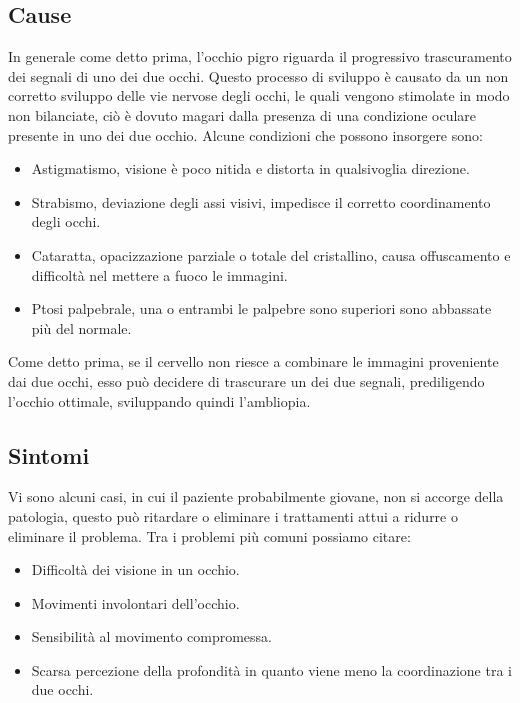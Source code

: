 \documentclass[10pt,a4paper]{article}
\begin{document}
	\subsection{Cause}
	In generale come detto prima, l'occhio pigro riguarda il progressivo trascuramento dei segnali di uno dei due occhi.
	Questo processo di sviluppo è causato da un non corretto sviluppo delle vie nervose degli occhi, le quali vengono stimolate in modo non bilanciate, ciò è dovuto magari dalla presenza di una condizione oculare presente in uno dei due occhio.
	Alcune condizioni che possono insorgere sono:
	\begin{itemize}
		\item Astigmatismo, visione è poco nitida e distorta in qualsivoglia direzione.
		\item Strabismo, deviazione degli assi visivi, impedisce il corretto coordinamento degli occhi. 
		\item Cataratta, opacizzazione parziale o totale del cristallino,  causa offuscamento e difficoltà nel mettere a fuoco le immagini.
		\item Ptosi palpebrale, una o entrambi le palpebre sono superiori sono abbassate più del normale.
	\end{itemize}
	Come detto prima, se il cervello non riesce a combinare le immagini proveniente dai due occhi, esso può decidere di trascurare un dei due segnali, prediligendo l'occhio ottimale, sviluppando quindi l'ambliopia.
	\subsection{Sintomi}
	Vi sono alcuni casi, in cui il paziente probabilmente giovane, non si accorge della patologia, questo può ritardare o eliminare i trattamenti attui a ridurre o eliminare il problema.
	Tra i problemi più comuni possiamo citare:	   
	\begin{itemize}
		\item Difficoltà dei visione in un occhio.
		\item Movimenti involontari dell'occhio.
		\item Sensibilità al movimento compromessa.
		\item Scarsa percezione della profondità in quanto viene meno la coordinazione tra i due occhi.
	\end{itemize} 
\newpage   
\end{document}
